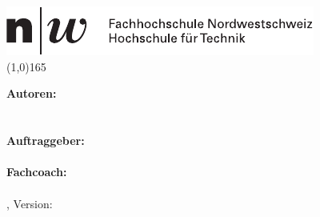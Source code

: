 \thispagestyle{plain}

\begin{titlepage}
	\begin{flushleft}
		\textbf{
			\hspace{-0.12cm}\LARGE{\doctype}\\
			\Huge{\titel}\\
			\vspace{0.5cm}
			\large{\untertitel}
		}
		\vspace{1cm}
		\vfill
		\large{
			\hspace{-1cm} \includegraphics{images/fhnw_logo_full}\\
			\line(1,0){165}	

			\vspace{0.5cm}
			\textbf{Autoren:}\\ \autorA\\ \autorB \\
			\vspace{0.5cm}
			\textbf{Auftraggeber:}\\ \dozent \\
			\vspace{0.5cm}
			\textbf{Fachcoach:}\\ \betreuer \\
			\vspace{0.5cm}
			\ort, \datum \hfill Version: \version
			\\
		}
	\end{flushleft}
\end{titlepage}

